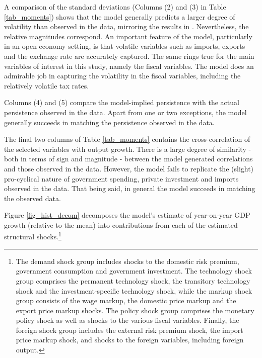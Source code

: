 \documentclass[a4paper,11pt]{article}
\numberwithin{equation}{section}
\begin{document}
	A comparison of the standard deviations (Columns (2) and (3) in Table \ref{tab_moments}) shows that the model generally predicts a larger degree of volatility than observed in the data, mirroring the results in \cite{steinbach2014}. Nevertheless, the relative magnitudes correspond. An important feature of the model, particularly in an open economy setting, is that volatile variables such as imports, exports and the exchange rate are accurately captured. The same rings true for the main variables of interest in this study, namely the fiscal variables. The model does an admirable job in capturing the volatility in the fiscal variables, including the relatively volatile tax rates.  
	
	Columns (4) and (5) compare the model-implied persistence with the actual persistence observed in the data. Apart from one or two exceptions, the model generally succeeds in matching the persistence observed in the data.
	
	The final two columns of Table \ref{tab_moments} contains the cross-correlation of the selected variables with output growth. There is a large degree of similarity - both in terms of sign and magnitude - between the model generated correlations and those observed in the data. However, the model fails to replicate the (slight) pro-cyclical nature of government spending, private investment and imports observed in the data. That being said, in general the model succeeds in matching the observed data. 
	
	Figure \ref{fig_hist_decom} decomposes the model's estimate of year-on-year GDP growth (relative to the mean) into contributions from each of the estimated structural shocks.\footnote{The demand shock group includes shocks to the domestic risk premium, government consumption and government investment. The technology shock group comprises the permanent technology shock, the transitory technology shock and the investment-specific technology shock, while the markup shock group consists of the wage markup, the domestic price markup and the export price markup shocks. The policy shock group comprises the monetary policy shock as well as shocks to the various fiscal variables. Finally, the foreign shock group includes the external risk premium shock, the import price markup shock, and shocks to the foreign variables, including foreign output.} 
	
\end{document}

